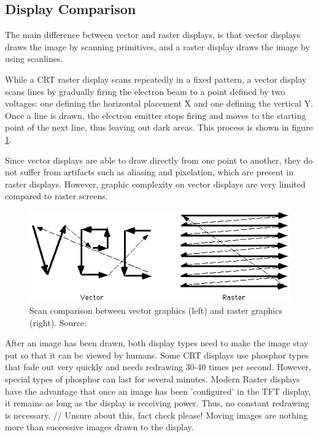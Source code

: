 \subsection{Display Comparison}
The main difference between vector and raster displays, is that vector displays draws the image by scanning primitives, and a raster display draws the image by using scanlines. 

While a CRT raster display scans repeatedly in a fixed pattern, a vector display scans lines by gradually firing the electron beam to a point defined by two voltages: one defining the horizontal placement X and one defining the vertical Y. 
Once a line is drawn, the electron emitter stops firing and moves to the starting point of the next line, thus leaving out dark areas. 
This process is shown in figure \ref{fig:vectorscan}.

Since vector displays are able to draw directly from one point to another, they do not suffer from artifacts such as aliasing and pixelation, which are present in raster displays\cite{vector-monitor}.
However, graphic complexity on vector displays are very limited compared to raster screens.

\begin{figure}[h!]
\centering \includegraphics[width=0.8\linewidth]{images/scan.png}
\caption{Scan comparison between vector graphics (left) and raster graphics (right). Source: \cite{vecvsras}}
\label{fig:vectorscan}
\end{figure}

After an image has been drawn, both display types need to make the image stay put so that it can be viewed by humans. 
Some CRT displays use phosphor types that fade out very quickly and needs redrawing 30-40 times per second\cite{vector-monitor}.
However, special types of phosphor can last for several minutes.
Modern Raster displays have the advantage that once an image has been 'configured' in the TFT display, it remains as long as the display is receiving power. 
Thus, no constant redrawing is necessary. // Unsure about this, fact check please!
Moving images are nothing more than successive images drawn to the display.

